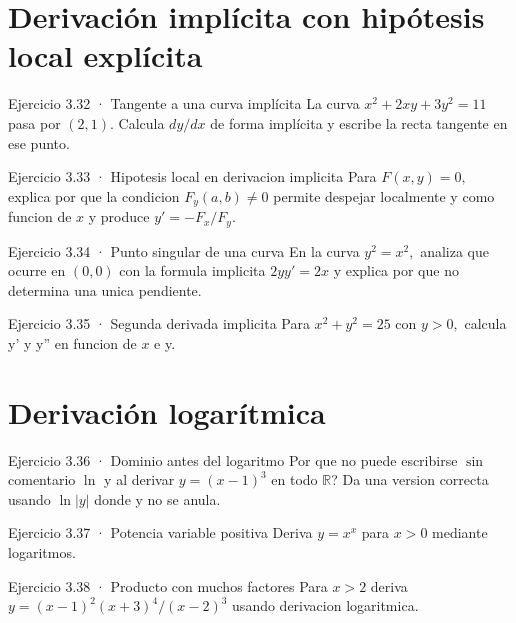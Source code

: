 \documentclass[10pt,a4paper,oneside,openany]{book}
\begin{document}
\section{Derivación implícita con hipótesis local explícita}
\begin{PSevenExerciseFixed}{Ejercicio 3.32 · Tangente a una curva implícita}
La curva \(x^2+2xy+3y^2=11\) pasa por \((2,1)\). Calcula \(dy/dx\) de forma implícita y escribe la recta tangente en ese punto.
\end{PSevenExerciseFixed}
\begin{PSevenExerciseFixed}{Ejercicio 3.33 · Hipotesis local en derivacion implicita}
Para \(F(x,y)=0,\) explica por que la condicion \(F_y(a,b)\ne 0\) permite despejar localmente y como funcion de \(x\) y produce \(y'=-F_x/F_y\).
\end{PSevenExerciseFixed}
\begin{PSevenExerciseFixed}{Ejercicio 3.34 · Punto singular de una curva}
En la curva \(y^{2}=x^{2},\) analiza que ocurre en \((0,0)\) con la formula implicita \(2yy'=2x\) y explica por que no determina una unica pendiente.
\end{PSevenExerciseFixed}
\begin{PSevenExerciseFixed}{Ejercicio 3.35 · Segunda derivada implicita}
Para \(x^{2}+y^{2}=25\) con \(y>0,\) calcula y' y y'' en funcion de \(x\) e y.
\end{PSevenExerciseFixed}
\section{Derivación logarítmica}
\begin{PSevenExerciseFixed}{Ejercicio 3.36 · Dominio antes del logaritmo}
Por que no puede escribirse \(\sin\) comentario \(\ln\) y al derivar \(y=(x-1)^{3}\) en todo \(\mathbb{R}\)? Da una version correcta usando \(\ln|y|\) donde y no se anula.
\end{PSevenExerciseFixed}
\begin{PSevenExerciseFixed}{Ejercicio 3.37 · Potencia variable positiva}
Deriva \(y=x^x\) para \(x>0\) mediante logaritmos.
\end{PSevenExerciseFixed}
\begin{PSevenExerciseFixed}{Ejercicio 3.38 · Producto con muchos factores}
Para \(x>2\) deriva \(y=(x-1)^{2}(x+3)^{4}/(x-2)^{3}\) usando derivacion logaritmica.
\end{PSevenExerciseFixed}
\end{document}
